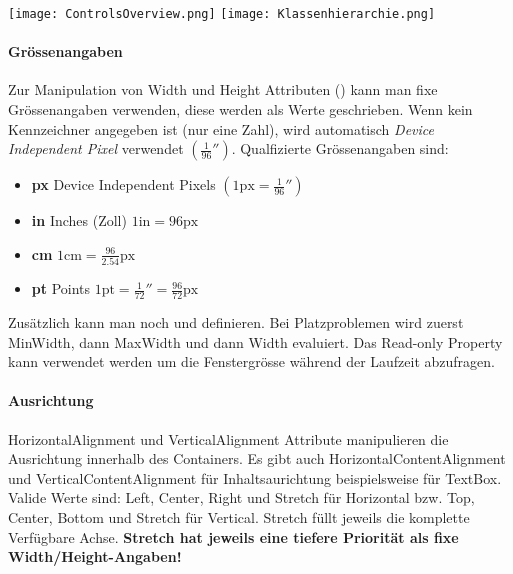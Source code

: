 \texttt{[image: ControlsOverview.png]}
\texttt{[image: Klassenhierarchie.png]}
\paragraph{Grössenangaben} Zur Manipulation von Width und Height Attributen () kann man fixe Grössenangaben verwenden, diese werden als  Werte geschrieben. Wenn kein Kennzeichner angegeben ist (nur eine Zahl), wird automatisch \textit{Device Independent Pixel} verwendet $\left(\frac{1}{96}''\right)$. Qualfizierte Grössenangaben sind:
\begin{itemize}
\item \textbf{px} Device Independent Pixels $\left(1\text{px} = \frac{1}{96}''\right)$
\item \textbf{in} Inches (Zoll) $1\text{in} = 96\text{px}$
\item \textbf{cm} $1\text{cm} = \frac{96}{2.54}\text{px}$
\item \textbf{pt} Points $1\text{pt} = \frac{1}{72}'' = \frac{96}{72}\text{px}$
\end{itemize}
Zusätzlich kann man noch  und  definieren. Bei Platzproblemen wird zuerst MinWidth, dann MaxWidth und dann Width evaluiert. Das Read-only Property  kann verwendet werden um die Fenstergrösse während der Laufzeit abzufragen. 
\paragraph{Ausrichtung} HorizontalAlignment und VerticalAlignment Attribute manipulieren die Ausrichtung innerhalb des Containers. Es gibt auch HorizontalContentAlignment und VerticalContentAlignment für Inhaltsaurichtung beispielsweise für TextBox. Valide Werte sind: Left, Center, Right und Stretch für Horizontal bzw. Top, Center, Bottom und Stretch für Vertical. Stretch füllt jeweils die komplette Verfügbare Achse. \textbf{Stretch hat jeweils eine tiefere Priorität als fixe Width/Height-Angaben!}
